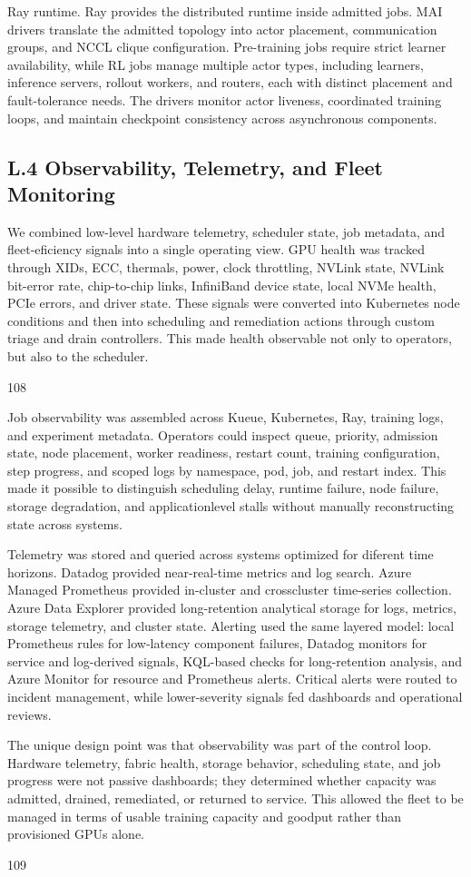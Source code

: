 \documentclass[
  10
]{article}
\begin{document}
Ray runtime. Ray provides the distributed runtime inside admitted jobs.
MAI drivers translate the admitted topology into actor placement,
communication groups, and NCCL clique configuration. Pre-training jobs
require strict learner availability, while RL jobs manage multiple actor
types, including learners, inference servers, rollout workers, and
routers, each with distinct placement and fault-tolerance needs. The
drivers monitor actor liveness, coordinated training loops, and maintain
checkpoint consistency across asynchronous components.

\subsection{L.4 Observability, Telemetry, and Fleet
Monitoring}\label{l.4-observability-telemetry-and-fleet-monitoring}

We combined low-level hardware telemetry, scheduler state, job metadata,
and fleet-eficiency signals into a single operating view. GPU health was
tracked through XIDs, ECC, thermals, power, clock throttling, NVLink
state, NVLink bit-error rate, chip-to-chip links, InfiniBand device
state, local NVMe health, PCIe errors, and driver state. These signals
were converted into Kubernetes node conditions and then into scheduling
and remediation actions through custom triage and drain controllers.
This made health observable not only to operators, but also to the
scheduler.

108

Job observability was assembled across Kueue, Kubernetes, Ray, training
logs, and experiment metadata. Operators could inspect queue, priority,
admission state, node placement, worker readiness, restart count,
training configuration, step progress, and scoped logs by namespace,
pod, job, and restart index. This made it possible to distinguish
scheduling delay, runtime failure, node failure, storage degradation,
and applicationlevel stalls without manually reconstructing state across
systems.

Telemetry was stored and queried across systems optimized for diferent
time horizons. Datadog provided near-real-time metrics and log search.
Azure Managed Prometheus provided in-cluster and crosscluster
time-series collection. Azure Data Explorer provided long-retention
analytical storage for logs, metrics, storage telemetry, and cluster
state. Alerting used the same layered model: local Prometheus rules for
low-latency component failures, Datadog monitors for service and
log-derived signals, KQL-based checks for long-retention analysis, and
Azure Monitor for resource and Prometheus alerts. Critical alerts were
routed to incident management, while lower-severity signals fed
dashboards and operational reviews.

The unique design point was that observability was part of the control
loop. Hardware telemetry, fabric health, storage behavior, scheduling
state, and job progress were not passive dashboards; they determined
whether capacity was admitted, drained, remediated, or returned to
service. This allowed the fleet to be managed in terms of usable
training capacity and goodput rather than provisioned GPUs alone.

109
\end{document}
